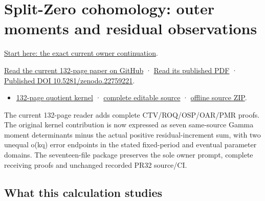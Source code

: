 \documentclass[
]{article}
\providecommand{\tightlist}{%
  \setlength{\itemsep}{0pt}\setlength{\parskip}{0pt}}
\begin{document}
\section{Split-Zero cohomology: outer moments and residual
observations}\label{split-zero-cohomology-outer-moments-and-residual-observations}

\href{https://github.com/KokunoYumeto/zeta-function-research-reader/blob/bf39bac055b76ce755b91401b35570bb84d76d9a/workbenches/splitzero-tandem/continuations/20260915-quotient-moment-continuation/00_CONTINUE_HERE.md}{Start
here: the exact current owner continuation}.

\href{https://github.com/KokunoYumeto/zeta-function-research-reader/blob/bf39bac055b76ce755b91401b35570bb84d76d9a/workbenches/splitzero-tandem/continuations/20260915-quotient-moment-continuation/15_CURRENT_MIXED_CONTROL_READER.pdf}{Read
the current 132-page paper on GitHub} ·
\href{https://zenodo.org/api/records/22759221/files/59-quotient-moment-reader.pdf/content}{Read
its published PDF} ·
\href{https://doi.org/10.5281/zenodo.22759221}{Published DOI
10.5281/zenodo.22759221}.

\begin{itemize}
\tightlist
\item
  \href{https://zenodo.org/api/records/22759221/files/59-quotient-moment-reader.pdf/content}{132-page
  quotient kernel} ·
  \href{https://github.com/KokunoYumeto/zeta-function-research-reader/tree/bf39bac055b76ce755b91401b35570bb84d76d9a/workbenches/splitzero-tandem/continuations/20260915-quotient-moment-continuation}{complete
  editable source} ·
  \href{https://zenodo.org/api/records/22759221/files/60-quotient-moment-sources.zip/content}{offline
  source ZIP}.
\end{itemize}

The current 132-page reader adds complete CTV/ROQ/OSP/OAR/PMR proofs.
The original kernel contribution is now expressed as seven same-source
Gamma moment determinants minus the actual positive residual-increment
sum, with two unequal o(kq) error endpoints in the stated fixed-period
and eventual parameter domains. The seventeen-file package preserves the
sole owner prompt, complete receiving proofs and unchanged recorded PR32
source/CI.

\subsection{What this calculation
studies}\label{what-this-calculation-studies}
\end{document}
